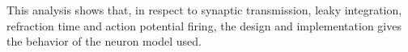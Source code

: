 	This analysis shows that, in respect to synaptic transmission, leaky integration, refraction time and action potential firing, the design and implementation gives the behavior of the neuron model used. 





	
	











